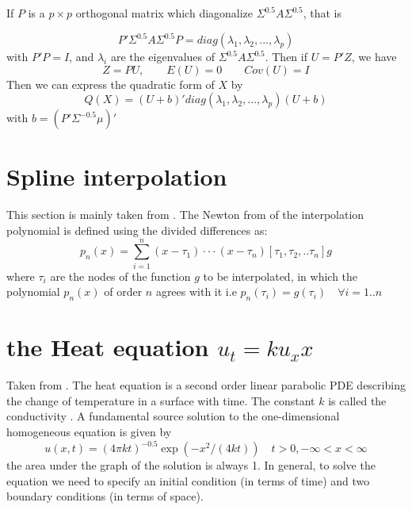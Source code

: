 \documentclass[12pt]{paper}
\begin{document}
If $P$ is a $p \times p$ orthogonal matrix which diagonalize $\Sigma^{0.5}A\Sigma^{0.5}$, that is 

\begin{equation*}
P'\Sigma^{0.5}A\Sigma^{0.5}P = diag(\lambda_1,\lambda_2,...,\lambda_p)
\end{equation*}
with $P'P=I$, and $\lambda_i$ are the eigenvalues of $\Sigma^{0.5} A \Sigma^{0.5}$.  Then if $U=P'Z$, we have 
\begin{equation*}
Z=PU, \qquad E(U)=0 \qquad Cov(U) = I
\end{equation*}
Then we can express the quadratic form of $X$ by 
\begin{equation}
Q(X) = (U+b)'diag(\lambda_1,\lambda_2,...,\lambda_p)(U+b)
\end{equation}
with $b = (P'\Sigma^{-0.5}\mu)'$ 

\section{Spline interpolation}\label{section_splineInterpolation}
This section is mainly taken from \cite{de1978practical}. The Newton from of the interpolation polynomial is defined using the divided differences as:
\begin{equation*}
p_n(x)=\sum_{i=1}^{n}(x-\tau_1)\cdot\cdot\cdot(x-\tau_n)[\tau_1,\tau_2,..\tau_n]g
\end{equation*}
where $\tau_i$ are the nodes of the function $g$ to be interpolated, in which the polynomial $p_n(x) $ of order $n$ agrees with it i.e $p_n(\tau_i)=g(\tau_i)\quad \forall i=1..n$

\section{the Heat equation $u_t=ku_xx$}
Taken from \cite{bleecker1992basic}. The heat equation is a second order linear parabolic PDE describing the change of temperature in a surface with time. The constant $k$ is called the conductivity . A fundamental source solution to the one-dimensional homogeneous equation is given by 
\begin{equation*}
u(x,t) = (4\pi kt)^{-0.5} \exp(-x^2/(4kt))\quad t>0, -\infty <x <\infty
\end{equation*}
the area under the graph of the solution is always 1. 
In general, to solve the equation we need to specify an initial condition (in terms of time) and two boundary conditions (in terms of space).
\end{document}
